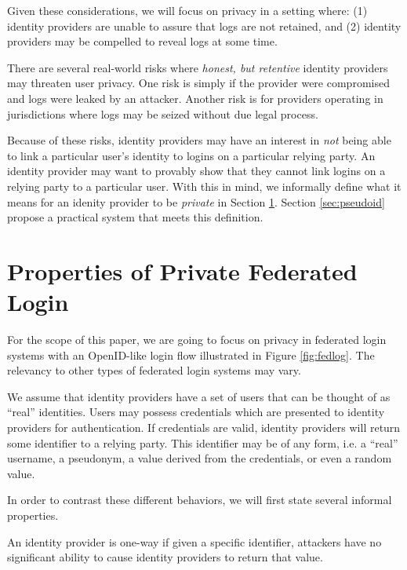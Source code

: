 \documentclass{llncs}
\begin{document}
Given these considerations, we will focus on privacy in a setting where:
(1) identity providers are unable to assure that logs are not retained, and
(2) identity providers may be compelled to reveal logs at some time.

There are several real-world risks where \emph{honest, but retentive}
identity providers may threaten user privacy. One risk is simply if
the provider were compromised and logs were leaked by an
attacker. Another risk is for providers operating in jurisdictions
where logs may be seized without due legal process. 

Because of these risks, identity providers may have an interest in \emph{not}
being able to link a particular user's identity to logins on a particular
relying party. An identity provider may want to provably show that
they cannot link logins on a relying party to a particular user. With
this in mind, we informally define what it means for an idenity
provider to be \emph{private} in Section
\ref{sec:private-fed-login}. Section \ref{sec:pseudoid} propose a
practical system that meets this definition.

\section{Properties of Private Federated Login}
\label{sec:private-fed-login}

For the scope of this paper, we are going to focus on privacy in
federated login systems with an OpenID-like login flow illustrated in
Figure \ref{fig:fedlog}. The relevancy to other types of federated
login systems may vary. 

We assume that identity providers have a set of users that can be
thought of as ``real'' identities. Users may possess credentials which
are presented to identity providers for authentication. If credentials
are valid, identity providers will return some identifier to a relying
party. This identifier may be of any form, i.e. a ``real'' username, a
pseudonym, a value derived from the credentials, or even a random value.

In order to contrast these different behaviors, we will first state
several informal properties.

\begin{definition}
\label{def:ownership}
An identity provider is one-way if given a specific identifier,
attackers have no significant ability to cause identity providers to
return that value.
\end{definition}
\end{document}
